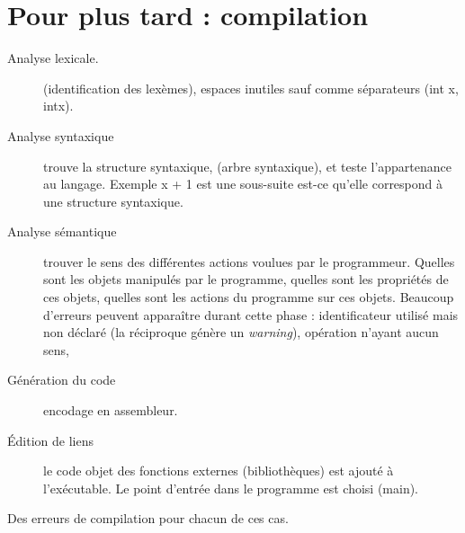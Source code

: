 \documentclass[12pt,a4paper]{article}
\begin{document}
\section{Pour plus tard : compilation}
\begin{description}
\item[Analyse lexicale.]  (identification des lexèmes), espaces inutiles
  sauf comme séparateurs (int x, intx).
\item[Analyse syntaxique] trouve la structure syntaxique, (arbre
  syntaxique), et teste l'appartenance au langage. Exemple x + 1 est
  une sous-suite est-ce qu'elle correspond à une structure syntaxique.
\item[Analyse sémantique] trouver le sens des différentes actions
  voulues par le programmeur. Quelles sont les objets manipulés par le
  programme, quelles sont les propriétés de ces objets, quelles sont
  les actions du programme sur ces objets. Beaucoup d'erreurs peuvent
  apparaître durant cette phase : identificateur utilisé mais non
  déclaré (la réciproque génère un \emph{warning}), opération n'ayant
  aucun sens,
\item[Génération du code] encodage en assembleur.
\item[Édition de liens] le code objet des fonctions externes
  (bibliothèques) est ajouté à l'exécutable. Le point d'entrée dans le
  programme est choisi (main).
\end{description}
Des erreurs de compilation pour chacun de ces cas.
\end{document}
